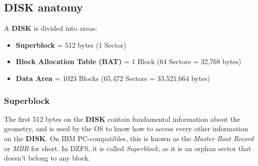 \documentclass[a4paper,11pt]{article}
\begin{document}
    \subsection{DISK anatomy}

    A \textbf{DISK} is divided into areas:

    \begin{itemize}
        \item \textbf{Superblock} = 512 bytes (1 Sector)
        \item \textbf{Block Allocation Table (BAT)} = 1 Block (64 Sectors = 32,768 bytes)
        \item \textbf{Data Area} = 1023 Blocks (65,472 Sectors = 33,521,664 bytes)
    \end{itemize}

        \subsubsection{Superblock}
        The first 512 bytes on the \textbf{DISK} contain fundamental information
        about the geometry, and is used by the OS to know how to access every
        other information on the \textbf{DISK}. On IBM PC-compatibles, this is
        known as the \textit{Master Boot Record} or \textit{MBR} for short. In
        DZFS, it is called \textit{Superblock}, as it is an orphan sector that
        doesn't belong to any block.
\end{document}
